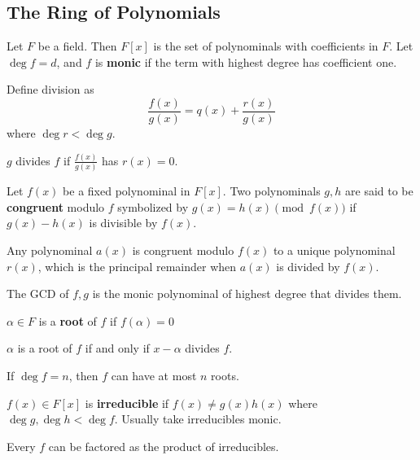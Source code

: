 \documentclass{article}
\begin{document}
\subsection{The Ring of Polynomials}
\begin{definition}
  Let \( F \) be a field.
  Then \( F[x] \) is the set of polynominals with coefficients in \(
  F \). Let \( \deg f = d \), and \( f \) is \textbf{monic} if the
  term with highest degree has coefficient one.
\end{definition}
\begin{definition}
  Define division as \[
    \frac{f(x)}{g(x)} = q(x) + \frac{r(x)}{g(x)}
  \] where \( \deg r < \deg g \).
\end{definition}
\begin{definition}
  \( g \) divides \( f \) if \( \frac{f(x)}{g(x)}  \) has \( r(x) = 0 \).
\end{definition}
\begin{definition}
  Let \( f(x)\) be a fixed polynominal in \( F[x] \). Two polynominals \( g, h \) are said to be \textbf{congruent} modulo \( f \) symbolized by \( g(x) = h(x) \pmod{f(x)} \) if \( g(x) - h(x) \) is divisible by \( f(x) \).
\end{definition}
\begin{remark}
  Any polynominal \( a(x) \) is congruent modulo \( f(x) \) to a unique polynominal \( r(x) \), which is the principal remainder when \( a(x) \) is divided by \( f(x) \).
\end{remark}
\begin{definition}
  The GCD of \( f, g \) is the monic polynominal of highest degree
  that divides them.
\end{definition}
\begin{definition}
  \( \alpha \in  F   \) is a \textbf{root} of \( f \) if \( f(\alpha   ) = 0\)
\end{definition}
\begin{theorem}
  \( \alpha  \) is a root of \( f \) if and only if \( x - \alpha  \)
  divides \( f \).
\end{theorem}
\begin{corollary}
  If \( \deg f = n \), then \( f \) can have at most \( n \) roots.
\end{corollary}
\begin{definition}
  \( f(x) \in F[x] \) is \textbf{irreducible} if \( f(x) \neq
  g(x)h(x) \) where \( \deg g, \deg h < \deg f \). Usually take
  irreducibles monic.
\end{definition}
\begin{theorem}
  Every \( f \) can be factored as the product of irreducibles.
\end{theorem}
\end{document}
